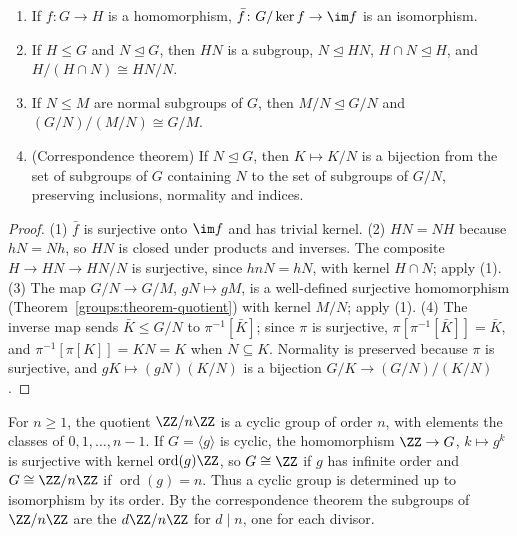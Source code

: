 \begin{theorem}\label{groups:theorem-isomorphism-theorems}
\begin{enumerate}
\item If $f \colon G \to H$ is a homomorphism, $\bar f \colon G/\ker f \to \im f$ is an
isomorphism.
\item If $H \leq G$ and $N \trianglelefteq G$, then $HN$ is a subgroup, $N \trianglelefteq HN$,
$H \cap N \trianglelefteq H$, and $H/(H \cap N) \cong HN/N$.
\item If $N \leq M$ are normal subgroups of $G$, then $M/N \trianglelefteq G/N$ and
$(G/N)/(M/N) \cong G/M$.
\item (Correspondence theorem) If $N \trianglelefteq G$, then $K \mapsto K/N$ is a bijection
from the set of subgroups of $G$ containing $N$ to the set of subgroups of $G/N$,
preserving inclusions, normality and indices.
\end{enumerate}
\end{theorem}

\begin{proof}
(1) $\bar f$ is surjective onto $\im f$ and has trivial kernel.
(2) $HN = NH$ because $hN = Nh$, so $HN$ is closed under products and inverses.
The composite $H \to HN \to HN/N$ is surjective, since $hnN = hN$, with kernel
$H \cap N$; apply (1).
(3) The map $G/N \to G/M$, $gN \mapsto gM$, is a well-defined surjective homomorphism
(Theorem~\ref{groups:theorem-quotient}) with kernel $M/N$; apply (1).
(4) The inverse map sends $\bar K \leq G/N$ to $\pi^{-1}[\bar K]$; since $\pi$ is
surjective, $\pi[\pi^{-1}[\bar K]] = \bar K$, and $\pi^{-1}[\pi[K]] = KN = K$ when
$N \subseteq K$. Normality is preserved because $\pi$ is surjective, and
$gK \mapsto (gN)(K/N)$ is a bijection $G/K \to (G/N)/(K/N)$.
\end{proof}

\begin{example}\label{groups:example-cyclic-groups}
For $n \geq 1$, the quotient $\ZZ/n\ZZ$ is a cyclic group of order $n$, with
elements the classes of $0, 1, \ldots, n-1$. If $G = \langle g \rangle$ is cyclic, the
homomorphism $\ZZ \to G$, $k \mapsto g^k$ is surjective with kernel
$\operatorname{ord}(g)\ZZ$, so $G \cong \ZZ$ if $g$ has infinite order and
$G \cong \ZZ/n\ZZ$ if $\operatorname{ord}(g) = n$. Thus a cyclic group is determined
up to isomorphism by its order. By the correspondence theorem the subgroups of
$\ZZ/n\ZZ$ are the $d\ZZ/n\ZZ$ for $d \mid n$, one for each divisor.
\end{example}

